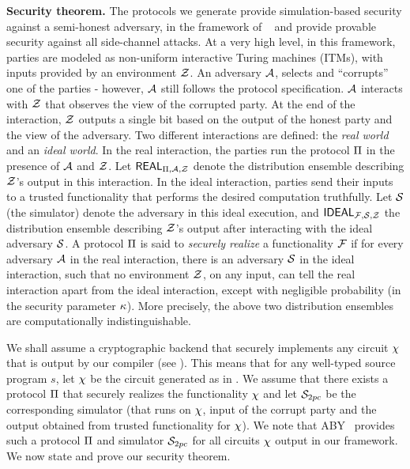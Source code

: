 \noindent\textbf{Security theorem.} The protocols we generate provide
simulation-based security against a semi-honest adversary, in the
framework of ~\cite{gmw,can00,can01} and provide provable security against all side-channel attacks.
At a very high level, in this
framework, parties are modeled as non-uniform interactive Turing
machines (ITMs), with inputs provided by an environment $\mathcal{Z}$. An
adversary $\mathcal{A}$, selects and ``corrupts'' one of the parties -
however, $\mathcal{A}$ still follows the protocol specification. $\mathcal{A}$
interacts with $\mathcal{Z}$ that observes the view of the corrupted
party. At the end of the interaction, $\mathcal{Z}$ outputs a single bit based on the output of the honest party and the view of the adversary. Two
different interactions are defined: the {\em real world} and an {\em
  ideal world}. In the real interaction, the parties run the protocol
$\Pi$ in the presence of $\mathcal{A}$ and $\mathcal{Z}$. Let
$\mathsf{REAL}_{\Pi,\mathcal{A},\mathcal{Z}}$ denote the  distribution ensemble
describing $\mathcal{Z}$'s output in this interaction. 
In the ideal interaction, parties send their inputs to  a
trusted functionality that performs the desired
computation truthfully. Let $\mathcal{S}$ (the simulator) denote the
adversary in this ideal execution, and $\mathsf{IDEAL}_{\mathcal{F},\mathcal{S},\mathcal{Z}}$
the distribution ensemble describing $\mathcal{Z}$'s output after
interacting with the ideal adversary $\mathcal{S}$. A
protocol $\Pi$ is said to {\em securely realize} a functionality
$\mathcal{F}$ if for every adversary $\mathcal{A}$ in the real interaction, there is
an adversary $\mathcal{S}$ in the ideal interaction, such that no
environment $\mathcal{Z}$, on any input, can tell the real interaction apart
from the ideal interaction, except with negligible probability (in the
security parameter $\kappa$). More precisely, the above two
distribution ensembles  are computationally indistinguishable. 

We shall assume a cryptographic \mpc backend that securely implements
any circuit $\chi$ that is output by our compiler
(see ). This means that for any
well-typed source program $s$, let $\chi$ be the circuit generated
as in . We assume that there
exists a \mpc protocol $\Pi$ that securely realizes the
functionality $\chi$ and let $\mathcal{S}_{\tiny{2pc}}$ be the
corresponding simulator  (that runs on $\chi$, input of the corrupt
party and the output obtained from trusted functionality for
$\chi$). We note that ABY~\cite{aby} provides such a protocol
$\Pi$ and simulator $\mathcal{S}_{\tiny{2pc}}$ for all circuits $\chi$
output in our framework. We now state and prove our
security theorem. 
 

